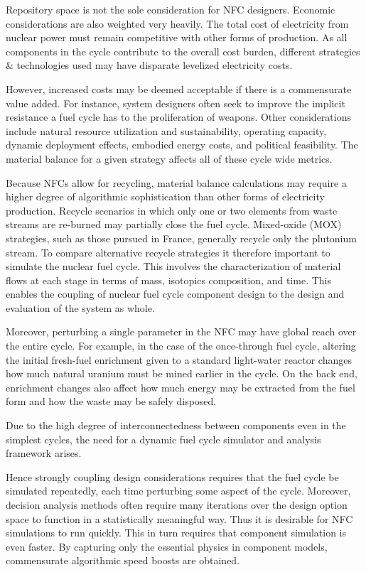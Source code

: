 Repository space is not the sole consideration for NFC designers.  Economic considerations 
are also weighted very heavily.  The total cost of electricity from nuclear power must remain competitive 
with other forms of production.  As all components in the cycle contribute to the overall cost burden, 
different strategies \& technologies used may have disparate levelized electricity costs.

However, increased costs may be deemed acceptable if there is a commensurate value added.
For instance, system designers often seek to improve the implicit resistance a fuel cycle 
has to the proliferation of weapons.  Other considerations include natural resource 
utilization and sustainability, operating capacity, dynamic deployment effects,
embodied energy costs, and political feasibility.  The material balance for a given strategy
affects all of these cycle wide metrics.

Because NFCs allow for recycling, material balance calculations may require a higher degree of
algorithmic sophistication than other forms of electricity production.  
Recycle scenarios in which only one or two 
elements from waste streams are re-burned may partially close the fuel cycle.  
Mixed-oxide (MOX) strategies, such as those pursued in France, 
generally recycle only the plutonium stream.  
To compare alternative recycle strategies it therefore important to simulate the nuclear fuel cycle.  
This involves the characterization 
of material flows at each stage in terms of mass, isotopics composition, and time.  This enables 
the coupling of nuclear fuel cycle component design to the design and evaluation of the system as whole.  

Moreover, perturbing a single parameter in the NFC may have global reach over the entire cycle.
For example, in the case of the once-through fuel cycle, altering the initial fresh-fuel 
 enrichment given to a standard light-water reactor changes how much natural 
uranium must be mined earlier in the cycle.  On the back end, enrichment changes also affect 
how much energy may be extracted from the fuel form and how the waste may be safely disposed.

Due to the high degree of interconnectedness between components 
even in the simplest cycles, the need for a dynamic 
fuel cycle simulator and analysis framework arises.

Hence strongly coupling design considerations requires that the fuel cycle be simulated repeatedly, each 
time perturbing some aspect of the cycle.  
Moreover, decision analysis methods often require many iterations over the design option space
to function in a statistically meaningful way.
Thus it is desirable for
NFC simulations to run quickly.  This in turn requires that component simulation is even faster. 
By capturing only the essential physics in component models, commensurate algorithmic speed 
boosts are obtained.

